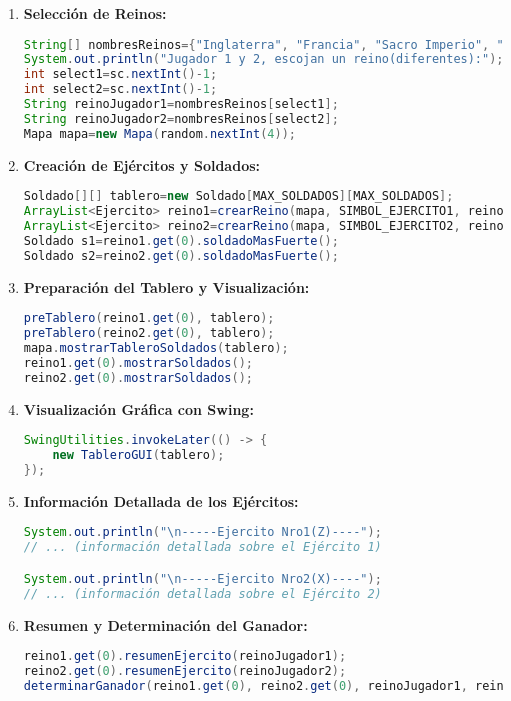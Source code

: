 \begin{enumerate}
  \item \textbf{Selección de Reinos:}
     \begin{lstlisting}[language=Java]
String[] nombresReinos={"Inglaterra", "Francia", "Sacro Imperio", "Castilla-Aragon", "Moros"};
System.out.println("Jugador 1 y 2, escojan un reino(diferentes):");
int select1=sc.nextInt()-1;
int select2=sc.nextInt()-1;
String reinoJugador1=nombresReinos[select1];
String reinoJugador2=nombresReinos[select2];
Mapa mapa=new Mapa(random.nextInt(4));
     \end{lstlisting}

  \item \textbf{Creación de Ejércitos y Soldados:}
     \begin{lstlisting}[language=Java]
Soldado[][] tablero=new Soldado[MAX_SOLDADOS][MAX_SOLDADOS];
ArrayList<Ejercito> reino1=crearReino(mapa, SIMBOL_EJERCITO1, reinoJugador1);
ArrayList<Ejercito> reino2=crearReino(mapa, SIMBOL_EJERCITO2, reinoJugador2);
Soldado s1=reino1.get(0).soldadoMasFuerte();
Soldado s2=reino2.get(0).soldadoMasFuerte();
     \end{lstlisting}

  \item \textbf{Preparación del Tablero y Visualización:}
     \begin{lstlisting}[language=Java]
preTablero(reino1.get(0), tablero);
preTablero(reino2.get(0), tablero);
mapa.mostrarTableroSoldados(tablero);
reino1.get(0).mostrarSoldados();
reino2.get(0).mostrarSoldados();
     \end{lstlisting}

  \item \textbf{Visualización Gráfica con Swing:}
     \begin{lstlisting}[language=Java]
SwingUtilities.invokeLater(() -> {
    new TableroGUI(tablero);
});
     \end{lstlisting}

  \item \textbf{Información Detallada de los Ejércitos:}
     \begin{lstlisting}[language=Java]
System.out.println("\n-----Ejercito Nro1(Z)----");
// ... (información detallada sobre el Ejército 1)

System.out.println("\n-----Ejercito Nro2(X)----");
// ... (información detallada sobre el Ejército 2)
     \end{lstlisting}

  \item \textbf{Resumen y Determinación del Ganador:}
     \begin{lstlisting}[language=Java]
reino1.get(0).resumenEjercito(reinoJugador1);
reino2.get(0).resumenEjercito(reinoJugador2);
determinarGanador(reino1.get(0), reino2.get(0), reinoJugador1, reinoJugador2);
     \end{lstlisting}


\end{enumerate}
